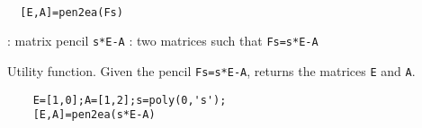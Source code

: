 
\begin{mandesc}
   \\ %
\end{mandesc}
\begin{calling_sequence}
\begin{verbatim}
  [E,A]=pen2ea(Fs)  
\end{verbatim}
\end{calling_sequence}
\begin{parameters}
  \begin{varlist}
    : matrix pencil \verb!s*E-A!
    : two matrices such that \verb!Fs=s*E-A!
  \end{varlist}
\end{parameters}
\begin{mandescription}
  Utility function. Given the pencil \verb!Fs=s*E-A!,
  returns the matrices \verb!E! and \verb!A!.
\end{mandescription}
\begin{examples}
  \begin{Verbatim}
    E=[1,0];A=[1,2];s=poly(0,'s');
    [E,A]=pen2ea(s*E-A)
  \end{Verbatim}
\end{examples}
